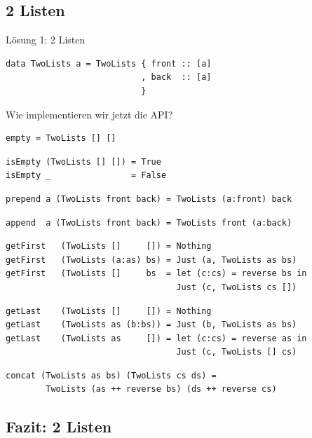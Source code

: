 \documentclass{beamer}
\begin{document}
\subsection{2 Listen}

\begin{frame}[fragile]
Lösung 1: 2 Listen
\begin{verbatim}
data TwoLists a = TwoLists { front :: [a]
                           , back  :: [a]
                           }
\end{verbatim}
\pause
Wie implementieren wir jetzt die API?
\end{frame}

\begin{frame}[fragile]
\begin{verbatim}
empty = TwoLists [] []
\end{verbatim}
\pause
\begin{verbatim}
isEmpty (TwoLists [] []) = True
isEmpty _                = False
\end{verbatim}
\pause
\begin{verbatim}
prepend a (TwoLists front back) = TwoLists (a:front) back
\end{verbatim}
\pause
\begin{verbatim}
append  a (TwoLists front back) = TwoLists front (a:back)
\end{verbatim}
\end{frame}

\begin{frame}[fragile]
\begin{verbatim}
getFirst   (TwoLists []     []) = Nothing
getFirst   (TwoLists (a:as) bs) = Just (a, TwoLists as bs)
getFirst   (TwoLists []     bs  = let (c:cs) = reverse bs in
                                  Just (c, TwoLists cs [])
\end{verbatim}
\pause
\begin{verbatim}
getLast    (TwoLists []     []) = Nothing
getLast    (TwoLists as (b:bs)) = Just (b, TwoLists as bs)
getLast    (TwoLists as     []) = let (c:cs) = reverse as in
                                  Just (c, TwoLists [] cs)
\end{verbatim}
\pause
\begin{verbatim}
concat (TwoLists as bs) (TwoLists cs ds) =
        TwoLists (as ++ reverse bs) (ds ++ reverse cs)
\end{verbatim}
\end{frame}

\subsection{Fazit: 2 Listen}
\end{document}
